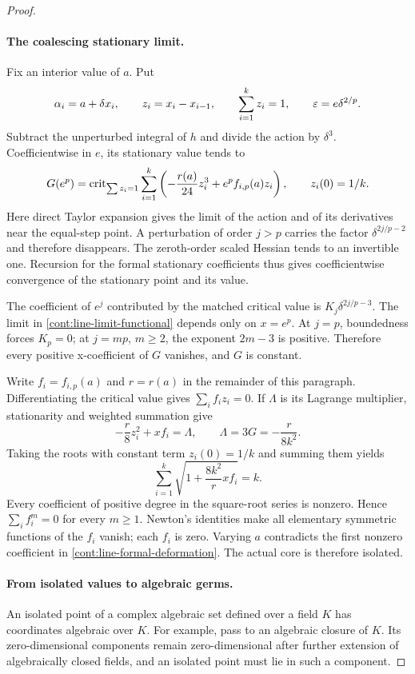 \begin{proof}
\paragraph{The coalescing stationary limit.}
Fix an interior value of \(a\).  Put
\[
 \alpha_i=a+\delta x_i,\qquad
 z_i=x_i-x_{i-1},\qquad \sum_{i=1}^kz_i=1,
 \qquad \varepsilon=e\delta^{2/p}.
 \]
Subtract the unperturbed integral of \(h\) and divide the
action by \(\delta^3\).  Coefficientwise in \(e\), its
stationary value tends to
\begin{equation}
 G(e^p)=\operatorname{crit}_{\sum z_i=1}
 \sum_{i=1}^k\left(-\frac{r(a)}{24}z_i^3
                    +e^p f_{i,p}(a)z_i\right),
 \qquad z_i(0)=1/k.
 \label{cont:line-limit-functional}
\end{equation}
Here direct Taylor expansion gives the limit of the
action and of its derivatives near the equal-step point.
A perturbation of order \(j>p\) carries the factor
\(\delta^{2j/p-2}\) and therefore disappears.  The
zeroth-order scaled Hessian tends to an invertible one.
Recursion for the formal stationary coefficients thus
gives coefficientwise convergence of the stationary
point and its value.

The coefficient of \(e^j\) contributed by the matched
critical value is \(K_j\delta^{2j/p-3}\).  The limit in
\eqref{cont:line-limit-functional} depends only on
\(x=e^p\).  At \(j=p\), boundedness forces \(K_p=0\);
at \(j=mp\), \(m\ge2\), the exponent \(2m-3\) is
positive.  Therefore every positive x-coefficient of
\(G\) vanishes, and \(G\) is constant.

Write \(f_i=f_{i,p}(a)\) and \(r=r(a)\) in the remainder
of this paragraph.  Differentiating the critical value
gives \(\sum_i f_i z_i=0\).  If \(\Lambda\) is its
Lagrange multiplier, stationarity and weighted summation
give
\[
 -\frac r8z_i^2+xf_i=\Lambda,\qquad
 \Lambda=3G=-\frac{r}{8k^2}.
 \]
Taking the roots with constant term \(z_i(0)=1/k\) and
summing them yields
\begin{equation}
 \sum_{i=1}^k
 \sqrt{1+\frac{8k^2}{r}xf_i}=k.
 \label{cont:line-power-sums}
\end{equation}
Every coefficient of positive degree in the square-root
series is nonzero.  Hence \(\sum_i f_i^m=0\) for every \(m\ge1\).
Newton's identities make all elementary symmetric
functions of the \(f_i\) vanish; each \(f_i\) is zero.
Varying \(a\) contradicts the first nonzero coefficient
in \eqref{cont:line-formal-deformation}.  The actual core
is therefore isolated.

\paragraph{From isolated values to algebraic germs.}
An isolated point of a complex algebraic set defined
over a field \(K\) has coordinates algebraic over \(K\).
For example, pass to an algebraic closure of \(K\).
Its zero-dimensional components remain zero-dimensional
after further extension of algebraically closed fields,
and an isolated point must lie in such a component.


\end{proof}
